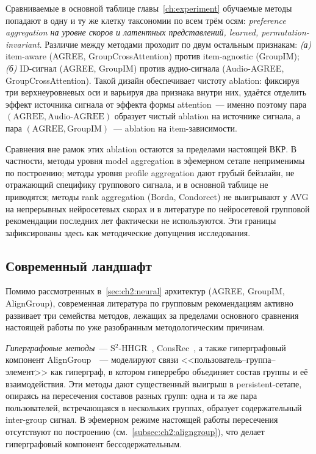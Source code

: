 Сравниваемые в основной таблице главы~\ref{ch:experiment} обучаемые методы попадают в одну и ту же клетку таксономии по всем трём осям: \emph{preference aggregation на уровне скоров и латентных представлений, learned, permutation-invariant}. Различие между методами проходит по двум остальным признакам: \emph{(а)} item-aware (AGREE, GroupCrossAttention) против item-agnostic (GroupIM); \emph{(б)} ID-сигнал (AGREE, GroupIM) против аудио-сигнала (Audio-AGREE, GroupCrossAttention). Такой дизайн обеспечивает чистоту ablation: фиксируя три верхнеуровневых оси и варьируя два признака внутри них, удаётся отделить эффект источника сигнала от эффекта формы attention~--- именно поэтому пара $(\text{AGREE}, \text{Audio-AGREE})$ образует чистый ablation на источнике сигнала, а пара $(\text{AGREE}, \text{GroupIM})$~--- ablation на item-зависимости.

Сравнения вне рамок этих ablation остаются за пределами настоящей ВКР. В частности, методы уровня model aggregation в эфемерном сетапе неприменимы по построению; методы уровня profile aggregation дают грубый бейзлайн, не отражающий специфику группового сигнала, и в основной таблице не приводятся; методы rank aggregation (Borda, Condorcet) не выигрывают у AVG на непрерывных нейросетевых скорах и в литературе по нейросетевой групповой рекомендации последних лет фактически не используются. Эти границы зафиксированы здесь как методические допущения исследования.

\subsection{Современный ландшафт}
\label{subsec:ch2:tax-landscape}

Помимо рассмотренных в~\ref{sec:ch2:neural} архитектур (AGREE, GroupIM, AlignGroup), современная литература по групповым рекомендациям активно развивает три семейства методов, лежащих за пределами основного сравнения настоящей работы по уже разобранным методологическим причинам.

\emph{Гиперграфовые методы}~--- S$^2$-HHGR~\cite{zhang2021hhgr}, ConsRec~\cite{wu2023consrec}, а также гиперграфовый компонент AlignGroup~\cite{xu2024aligngroup}~--- моделируют связи <<пользователь--группа--элемент>> как гиперграф, в котором гиперребро объединяет состав группы и её взаимодействия. Эти методы дают существенный выигрыш в persistent-сетапе, опираясь на пересечения составов разных групп: одна и та же пара пользователей, встречающаяся в нескольких группах, образует содержательный inter-group сигнал. В эфемерном режиме настоящей работы пересечения отсутствуют по построению (см.~\ref{subsec:ch2:aligngroup}), что делает гиперграфовый компонент бессодержательным.

